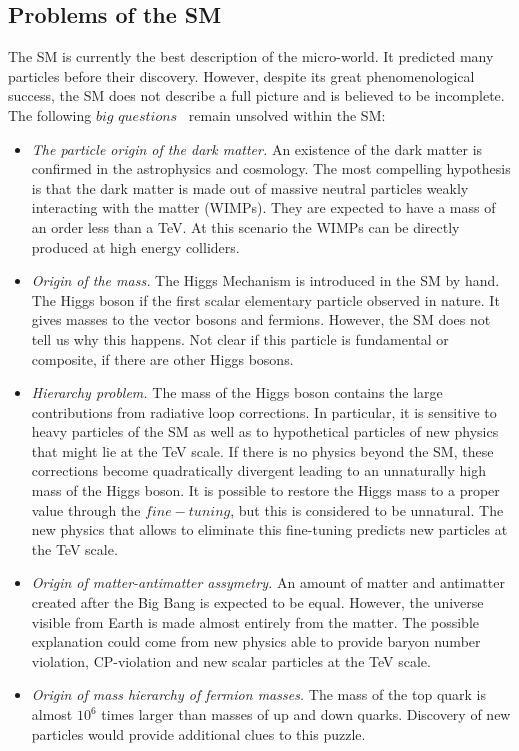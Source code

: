 \subsection{Problems of the SM}

The SM is currently the best description of the micro-world. It predicted many particles before their discovery. However, despite its great phenomenological success, the SM does not describe a full picture and is believed to be incomplete. The following $big$ $questions$~\cite{Gershtein:2013iqa} remain unsolved within the SM:
\begin{itemize}
\item \textit{The particle origin of the dark matter.} An existence of the dark matter is confirmed in the astrophysics and cosmology. The most compelling hypothesis is that the dark matter is made out of massive neutral particles weakly interacting with the matter (WIMPs). They are expected to have a mass of an order less than a TeV. At this scenario the WIMPs can be directly produced at high energy colliders.
\item \textit{Origin of the mass.} The Higgs Mechanism is introduced in the SM by hand. The Higgs boson if the first scalar elementary particle observed in nature. It gives masses to the vector bosons and fermions. However, the SM does not tell us why this happens. Not clear if this particle is fundamental or composite, if there are other Higgs bosons.
\item \textit{Hierarchy problem.} The mass of the Higgs boson contains the large contributions from radiative loop corrections. In particular, it is sensitive to heavy particles of the SM as well as to hypothetical particles of new physics that might lie at the TeV scale. If there is no physics beyond the SM, these corrections become quadratically divergent leading to an unnaturally high mass of the Higgs boson. It is possible to restore the Higgs mass to a proper value through the $fine-tuning$, but this is considered to be unnatural. The new physics that allows to eliminate this fine-tuning predicts new particles at the TeV scale.
\item \textit{Origin of matter-antimatter assymetry.} An amount of matter and antimatter created after the Big Bang is expected to be equal. However, the universe visible from Earth is made almost entirely from the matter.
The possible explanation could come from new physics able to provide baryon number violation, CP-violation and new scalar particles at the TeV scale.
\item \textit{Origin of mass hierarchy of fermion masses.} The mass of the top quark is almost $10^6$ times larger than masses of up and down quarks. Discovery of new particles would provide additional clues to this puzzle.

\end{itemize}
